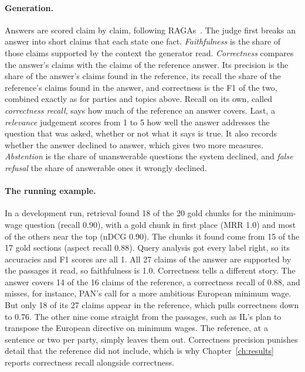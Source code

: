 \paragraph{Generation.} Answers are scored claim by claim, following
RAGAs~\citep{es2024ragas}. The judge first breaks an answer into short claims
that each state one fact. \emph{Faithfulness} is the share of those claims
supported by the context the generator read. \emph{Correctness} compares the
answer's claims with the claims of the reference answer. Its precision is the
share of the answer's claims found in the reference, its recall the share of
the reference's claims found in the answer, and correctness is the F1 of the
two, combined exactly as for parties and topics above. Recall on its own, called \emph{correctness recall}, says how much of the
reference an answer covers. Last, a \emph{relevance} judgement scores from 1 to
5 how well the answer addresses the question that was asked, whether or not
what it says is true. It also records whether the
answer declined to answer, which gives two more measures. \emph{Abstention} is
the share of unanswerable questions the system declined, and \emph{false
refusal} the share of answerable ones it wrongly declined.

\paragraph{The running example.} In a development run, retrieval found 18 of
the 20 gold chunks for the minimum-wage question (recall 0.90), with a gold
chunk in first place (MRR 1.0) and most of the others near the top (nDCG
0.90). The chunks it found come from 15 of the 17 gold sections (aspect recall
0.88). Query analysis got every label right, so its accuracies and F1 scores
are all 1. All 27 claims of the answer are supported by the passages it read, so
faithfulness is 1.0. Correctness tells a different story. The answer covers 14
of the 16 claims of the reference, a correctness recall of 0.88, and misses,
for instance, PAN's call for a more ambitious European minimum wage. But only
18 of its 27 claims appear in the reference, which pulls correctness down to
0.76. The other nine come straight from the passages, such as IL's plan to
transpose the European directive on minimum wages. The reference, at a
sentence or two per party, simply leaves them out. Correctness precision
punishes detail that the reference did not include, which is why
Chapter~\ref{ch:results} reports correctness recall alongside correctness.

